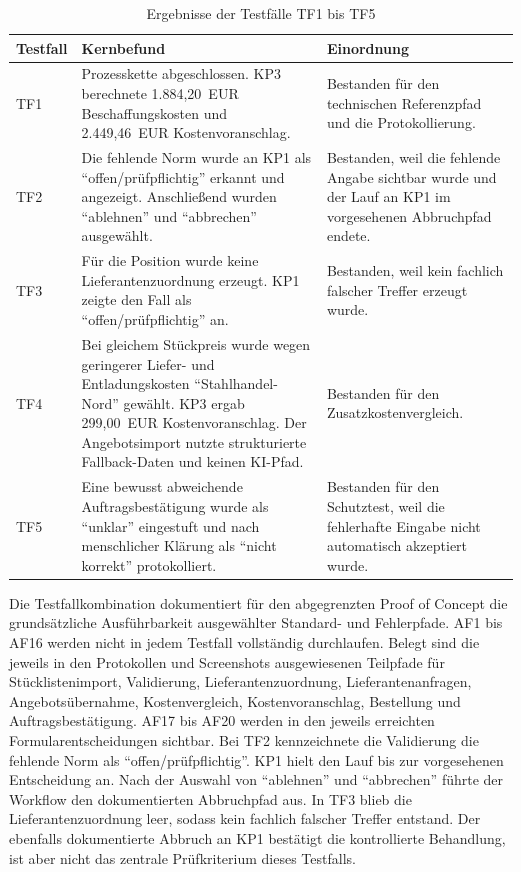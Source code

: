 \documentclass[a4paper,12pt]{article}
\begin{document}
\begin{table}[H]
    \captionsetup{justification=raggedright,singlelinecheck=false}
    \caption{Ergebnisse der Testfälle TF1 bis TF5}
    \label{tab:testfallergebnisse}
    \footnotesize
    \begin{tabularx}{\textwidth}{@{}lXX@{}}
        \toprule
        Testfall & Kernbefund & Einordnung \\
        \midrule
        TF1 & Prozesskette abgeschlossen. KP3 berechnete 1.884,20~EUR Beschaffungskosten und 2.449,46~EUR Kostenvoranschlag. & Bestanden für den technischen Referenzpfad und die Protokollierung. \\
        TF2 & Die fehlende Norm wurde an KP1 als \enquote{offen/prüfpflichtig} erkannt und angezeigt. Anschließend wurden \enquote{ablehnen} und \enquote{abbrechen} ausgewählt. & Bestanden, weil die fehlende Angabe sichtbar wurde und der Lauf an KP1 im vorgesehenen Abbruchpfad endete. \\
        TF3 & Für die Position wurde keine Lieferantenzuordnung erzeugt. KP1 zeigte den Fall als \enquote{offen/prüfpflichtig} an. & Bestanden, weil kein fachlich falscher Treffer erzeugt wurde. \\
        TF4 & Bei gleichem Stückpreis wurde wegen geringerer Liefer- und Entladungskosten \enquote{Stahlhandel-Nord} gewählt. KP3 ergab 299,00~EUR Kostenvoranschlag. Der Angebotsimport nutzte strukturierte Fallback-Daten und keinen KI-Pfad. & Bestanden für den Zusatzkostenvergleich. \\
        TF5 & Eine bewusst abweichende Auftragsbestätigung wurde als \enquote{unklar} eingestuft und nach menschlicher Klärung als \enquote{nicht korrekt} protokolliert. & Bestanden für den Schutztest, weil die fehlerhafte Eingabe nicht automatisch akzeptiert wurde. \\
        \bottomrule
    \end{tabularx}
\end{table}

Die Testfallkombination dokumentiert für den abgegrenzten Proof of Concept die grundsätzliche Ausführbarkeit ausgewählter Standard- und Fehlerpfade. AF1 bis AF16 werden nicht in jedem Testfall vollständig durchlaufen. Belegt sind die jeweils in den Protokollen und Screenshots ausgewiesenen Teilpfade für Stücklistenimport, Validierung, Lieferantenzuordnung, Lieferantenanfragen, Angebotsübernahme, Kostenvergleich, Kostenvoranschlag, Bestellung und Auftragsbestätigung. AF17 bis AF20 werden in den jeweils erreichten Formularentscheidungen sichtbar. Bei TF2 kennzeichnete die Validierung die fehlende Norm als \enquote{offen/prüfpflichtig}. KP1 hielt den Lauf bis zur vorgesehenen Entscheidung an. Nach der Auswahl von \enquote{ablehnen} und \enquote{abbrechen} führte der Workflow den dokumentierten Abbruchpfad aus. In TF3 blieb die Lieferantenzuordnung leer, sodass kein fachlich falscher Treffer entstand. Der ebenfalls dokumentierte Abbruch an KP1 bestätigt die kontrollierte Behandlung, ist aber nicht das zentrale Prüfkriterium dieses Testfalls.
\end{document}
